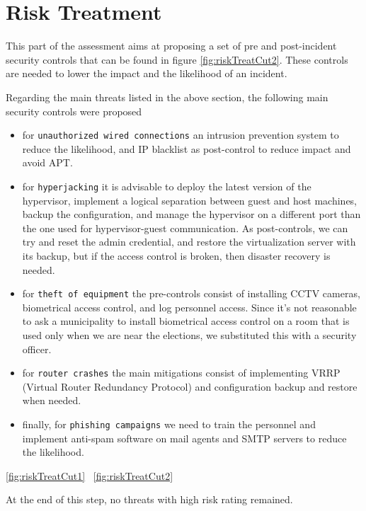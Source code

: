 \section*{Risk Treatment}

This part of the assessment aims at proposing a set of pre and post-incident security controls that can be found in figure \ref{fig:riskTreatCut2}. These controls are needed to lower the impact and the likelihood of an incident.

Regarding the main threats listed in the above section, the following main security controls were proposed

\begin{itemize}
    \item for \texttt{unauthorized wired connections} an intrusion prevention system to reduce the likelihood, and IP blacklist as post-control to reduce impact and avoid APT.
    \item for \texttt{hyperjacking} it is advisable to deploy the latest version of the hypervisor, implement a logical separation between guest and host machines, backup the configuration, and manage the hypervisor on a different port than the one used for hypervisor-guest communication\cite{online:virtualSec}. As post-controls, we can try and reset the admin credential, and restore the virtualization server with its backup, but if the access control is broken, then disaster recovery is needed.
    \item for \texttt{theft of equipment} the pre-controls consist of installing CCTV cameras, biometrical access control, and log personnel access. Since it's not reasonable to ask a municipality to install biometrical access control on a room that is used only when we are near the elections, we substituted this with a security officer.\cite{online:roomSec}
    \item for \texttt{router crashes} the main mitigations consist of implementing VRRP (Virtual Router Redundancy Protocol) \cite{online:VRRP} and configuration backup and restore when needed.
    \item finally, for \texttt{phishing campaigns} we need to train the personnel and implement anti-spam software on mail agents and SMTP servers to reduce the likelihood.
\end{itemize}

\ref{fig:riskTreatCut1}
~\ref{fig:riskTreatCut2}

At the end of this step, no threats with high risk rating remained.\\

